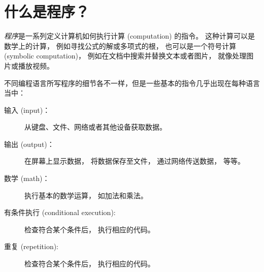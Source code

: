 \section{什么是程序？}



{\em 程序}是一系列定义计算机如何执行计算 (computation) 的指令。 这种计算可以是数学上的计算， 例如寻找公式的解或多项式的根， 也可以是一个符号计算 (symbolic computation)， 例如在文档中搜索并替换文本或者图片， 就像处理图片或播放视频。



不同编程语言所写程序的细节各不一样，但是一些基本的指令几乎出现在每种语言当中：


\begin{description}

\item[输入 (input)：] 从键盘、文件、网络或者其他设备获取数据。

\item[输出 (output)：] 在屏幕上显示数据， 将数据保存至文件， 通过网络传送数据， 等等。

\item[数学 (math)：] 执行基本的数学运算， 如加法和乘法。

\item[有条件执行 (conditional execution):] 检查符合某个条件后， 执行相应的代码。

\item[重复 (repetition):] 检查符合某个条件后， 执行相应的代码。

\end{description}

